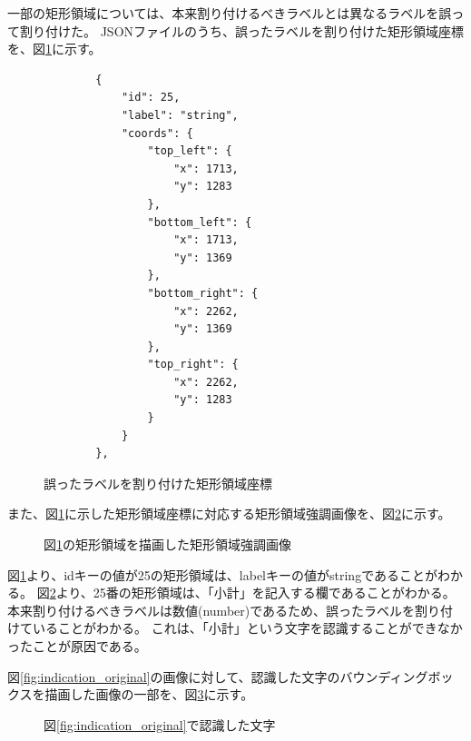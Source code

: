 一部の矩形領域については、本来割り付けるべきラベルとは異なるラベルを誤って割り付けた。
JSONファイルのうち、誤ったラベルを割り付けた矩形領域座標を、図\ref{fig:rects_data_miss_json}に示す。
\lstset{language=}
\begin{figure}[tp]
    \begin{lstlisting}
        {
            "id": 25,
            "label": "string",
            "coords": {
                "top_left": {
                    "x": 1713,
                    "y": 1283
                },
                "bottom_left": {
                    "x": 1713,
                    "y": 1369
                },
                "bottom_right": {
                    "x": 2262,
                    "y": 1369
                },
                "top_right": {
                    "x": 2262,
                    "y": 1283
                }
            }
        },
    \end{lstlisting}
    \caption{誤ったラベルを割り付けた矩形領域座標}\label{fig:rects_data_miss_json}
\end{figure}
また、図\ref{fig:rects_data_miss_json}に示した矩形領域座標に対応する矩形領域強調画像を、図\ref{fig:highlighted_rects_miss_part}に示す。
\begin{figure}[tp]
    \begin{center}
        \caption{図\ref{fig:rects_data_miss_json}の矩形領域を描画した矩形領域強調画像}
        \label{fig:highlighted_rects_miss_part}
    \end{center}
\end{figure}
図\ref{fig:rects_data_miss_json}より、idキーの値が25の矩形領域は、labelキーの値がstringであることがわかる。
図\ref{fig:highlighted_rects_miss_part}より、25番の矩形領域は、「小計」を記入する欄であることがわかる。
本来割り付けるべきラベルは数値(number)であるため、誤ったラベルを割り付けていることがわかる。
これは、「小計」という文字を認識することができなかったことが原因である。

図\ref{fig:indication_original}の画像に対して、認識した文字のバウンディングボックスを描画した画像の一部を、図\ref{fig:OCR_result}に示す。
\begin{figure}[tp]
    \begin{center}
        \caption{図\ref{fig:indication_original}で認識した文字}
        \label{fig:OCR_result}
    \end{center}
\end{figure}

